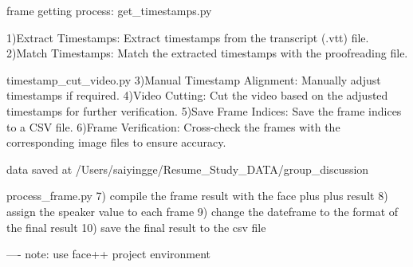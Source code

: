 

frame getting process:
get_timestamps.py

1)Extract Timestamps: Extract timestamps from the transcript (.vtt) file. 
2)Match Timestamps: Match the extracted timestamps with the proofreading file.

timestamp_cut_video.py
3)Manual Timestamp Alignment: Manually adjust timestamps if required.
4)Video Cutting: Cut the video based on the adjusted timestamps for further verification.
5)Save Frame Indices: Save the frame indices to a CSV file.
6)Frame Verification: Cross-check the frames with the corresponding image files to ensure accuracy.

data saved at /Users/saiyingge/Resume_Study_DATA/group_discussion

process_frame.py
7) compile the frame result with the face plus plus result
8) assign the speaker value to each frame
9) change the dateframe to the format of the final result
10) save the final result to the csv file


----
note:
use face++ project environment